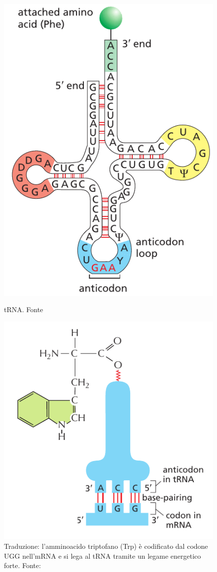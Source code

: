 \begin{figure}[!htb]
	\centering
	\includegraphics[scale=0.32]{images/tRNA.png}
	\caption{tRNA. Fonte \cite{alberts2018essential}}
	\label{fig:tRNA}
	\endminipage\hfill
	\centering
	\includegraphics[scale=0.45]{images/tRNA-legame-traduzione.png}
	\caption{Traduzione: l'amminoacido triptofano (Trp) è codificato dal codone UGG nell'mRNA e si lega al tRNA tramite un legame energetico forte. Fonte: \cite{alberts2018essential}}
	\label{fig:tRNA-legame}
	\endminipage\hfill
\end{figure}

